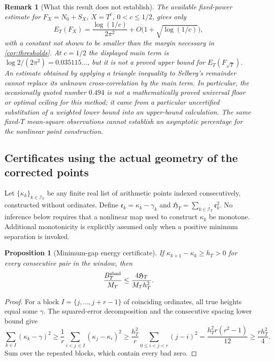 \documentclass[11pt,reqno]{amsart}
\numberwithin{equation}{section}
\newtheorem{proposition}[theorem]{Proposition}
\newtheorem{remark}[theorem]{Remark}
\begin{document}
\begin{remark}[What this result does not establish]
\label{rem:unprovedpercentage}
The available fixed-power estimate for $F_X=N_0+S_X$, $X=T^c$,
$0<c\le1/2$, gives only
\[
E_T(F_X)=\frac{\log(1/c)}{2\pi^2}
+O\bigl(1+\sqrt{\log(1/c)}\bigr),
\]
with a constant not shown to be smaller than the margin necessary in
\cref{cor:thresholds}.  At $c=1/2$ the displayed main term is
$\log2/(2\pi^2)=0.035115\dots$, but it is \emph{not} a proved upper
bound for $E_T(F_{\sqrt T})$.  An estimate obtained by applying a
triangle inequality to Selberg's remainder cannot replace its unknown
cross-correlation by the main term.  In particular, the occasionally
quoted number $0.494$ is not a mathematically proved universal floor
or optimal ceiling for this method; it came from a particular
uncertified substitution of a weighted lower bound into an upper-bound
calculation.  The same fixed-$T$ mean-square observations cannot establish
an asymptotic percentage for the nonlinear point construction.
\end{remark}

\subsection{Certificates using the actual geometry of the corrected points}
\label{subsec:gapcertificates}
Let $\{\kappa_k\}_{k\in\mathcal I_T}$ be any finite real list of
arithmetic points indexed consecutively, constructed without ordinates.
Define $\mathfrak e_k=\kappa_k-\gamma_k$ and
$\mathfrak H_T=\sum_{k\in\mathcal I_T}\mathfrak e_k^2$.
No inference below requires that a nonlinear map used to construct
$\kappa_k$ be monotone.  Additional monotonicity is explicitly
assumed only when a positive minimum separation is invoked.

\begin{proposition}[Minimum-gap energy certificate]
\label{prop:mingapcertificate}
If $\kappa_{k+1}-\kappa_k\ge h_T>0$ for every consecutive pair in
the window, then
\begin{equation}\label{eq:mingapcertificate}
\frac{B_T^{\rm zbad}}{M_T}\le
\frac{4\mathfrak H_T}{M_T h_T^2}.
\end{equation}
\end{proposition}
\begin{proof}
For a block $I=\{j,\dots,j+r-1\}$ of coinciding ordinates,
all true heights equal some $\gamma$. The squared-error decomposition
and the consecutive spacing lower bound give
\[
\sum_{k\in I}(\kappa_k-\gamma)^2
\ge\frac1r\sum_{i<j\,\in I}(\kappa_j-\kappa_i)^2
\ge\frac{h_T^2}{r}\sum_{0\le i<j<r}(j-i)^2
=\frac{h_T^2r(r^2-1)}{12}\ge\frac{rh_T^2}{4}.
\]
Sum over the repeated blocks, which contain every bad zero.
\end{proof}
\end{document}
